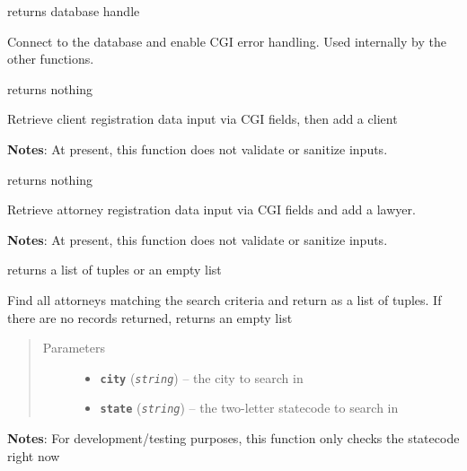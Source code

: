 \documentclass[letterpaper,10pt,english]{sphinxmanual}
\begin{document}

\begin{fulllineitems}
\label{DBOps:DBOps.dbConnect}
returns database handle

Connect to the database and enable CGI error handling. Used internally by the other functions.

\end{fulllineitems}


\begin{fulllineitems}
\label{DBOps:DBOps.regClient}
returns nothing

Retrieve client registration data input via CGI fields, then add a client

\textbf{Notes}:
At present, this function does not validate or sanitize inputs.

\end{fulllineitems}


\begin{fulllineitems}
\label{DBOps:DBOps.regLawyer}
returns nothing

Retrieve attorney registration data input via CGI fields and add a lawyer.

\textbf{Notes}:
At present, this function does not validate or sanitize inputs.

\end{fulllineitems}


\begin{fulllineitems}
\label{DBOps:DBOps.searchAdvanced}
returns a list of tuples or an empty list

Find all attorneys matching the search criteria and return as a list of tuples. If there are no records returned, returns an empty list
\begin{quote}\begin{description}
\item[{Parameters}] \leavevmode\begin{itemize}
\item {} 
\textbf{\texttt{city}} (\emph{\texttt{string}}) -- the city to search in

\item {} 
\textbf{\texttt{state}} (\emph{\texttt{string}}) -- the two-letter statecode to search in

\end{itemize}

\end{description}\end{quote}

\textbf{Notes}:
For development/testing purposes, this function only checks the statecode right now

\end{fulllineitems}
\end{document}
